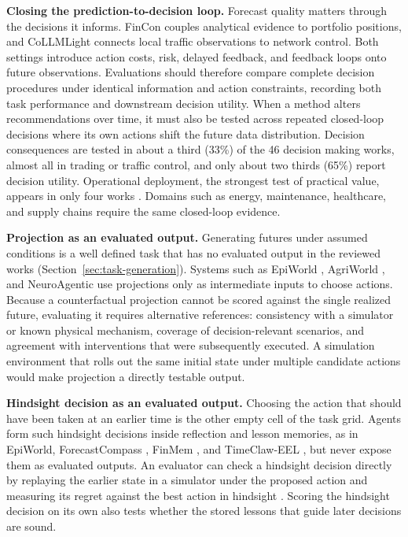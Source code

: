 \documentclass[preprints,article,submit,moreauthors]{Definitions/mdpi}
\begin{document}
\noindent\textbf{Closing the prediction-to-decision loop.} Forecast quality matters through the decisions it informs. FinCon \citep{fincon2024} couples analytical evidence to portfolio positions, and CoLLMLight \citep{collmllight2026} connects local traffic observations to network control. Both settings introduce action costs, risk, delayed feedback, and feedback loops onto future observations. Evaluations should therefore compare complete decision procedures under identical information and action constraints, recording both task performance and downstream decision utility. When a method alters recommendations over time, it must also be tested across repeated closed-loop decisions where its own actions shift the future data distribution. Decision consequences are tested in about a third (33\%) of the 46 decision making works, almost all in trading or traffic control, and only about two thirds (65\%) report decision utility. Operational deployment, the strongest test of practical value, appears in only four works \citep{trafficr12025,steward2026,epicoach2026,finanalyst2026}. Domains such as energy, maintenance, healthcare, and supply chains require the same closed-loop evidence.

\noindent\textbf{Projection as an evaluated output.} Generating futures under assumed conditions is a well defined task that has no evaluated output in the reviewed works (Section~\ref{sec:task-generation}). Systems such as EpiWorld \citep{epiworld2026}, AgriWorld \citep{agriworld2026}, and NeuroAgentic \citep{neuroagentic2026} use projections only as intermediate inputs to choose actions. Because a counterfactual projection cannot be scored against the single realized future, evaluating it requires alternative references: consistency with a simulator or known physical mechanism, coverage of decision-relevant scenarios, and agreement with interventions that were subsequently executed. A simulation environment that rolls out the same initial state under multiple candidate actions would make projection a directly testable output.

\noindent\textbf{Hindsight decision as an evaluated output.} Choosing the action that should have been taken at an earlier time is the other empty cell of the task grid. Agents form such hindsight decisions inside reflection and lesson memories, as in EpiWorld, ForecastCompass \citep{forecastcompass2026}, FinMem \citep{finmem2023}, and TimeClaw-EEL \citep{timeclaw2026explore}, but never expose them as evaluated outputs. An evaluator can check a hindsight decision directly by replaying the earlier state in a simulator under the proposed action and measuring its regret against the best action in hindsight \citep{cesabianchi2006prediction}. Scoring the hindsight decision on its own also tests whether the stored lessons that guide later decisions are sound.
\end{document}
